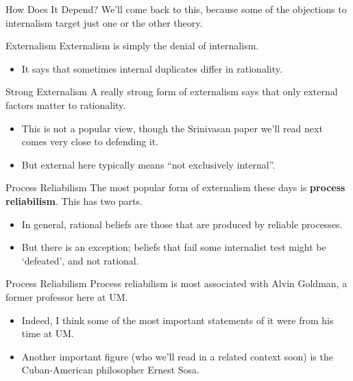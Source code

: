 \documentclass[
  17pt,
  letterpaper,
  ignorenonframetext,
  aspectratio=169,
  handout]{beamer}
\providecommand{\tightlist}{%
  \setlength{\itemsep}{0pt}\setlength{\parskip}{0pt}}\usepackage{longtable,booktabs,array}
\begin{document}
\begin{frame}{How Does It Depend?}
\protect\hypertarget{how-does-it-depend-1}{}
We'll come back to this, because some of the objections to internalism
target just one or the other theory.
\end{frame}

\begin{frame}{Externalism}
\protect\hypertarget{externalism}{}
Externalism is simply the denial of internalism.

\begin{itemize}[<+->]
\tightlist
\item
  It says that sometimes internal duplicates differ in rationality.
\end{itemize}
\end{frame}

\begin{frame}{Strong Externalism}
\protect\hypertarget{strong-externalism}{}
A really strong form of externalism says that only external factors
matter to rationality.

\begin{itemize}[<+->]
\tightlist
\item
  This is not a popular view, though the Srinivasan paper we'll read
  next comes very close to defending it.
\item
  But external here typically means ``not exclusively internal''.
\end{itemize}
\end{frame}

\begin{frame}{Process Reliabilism}
\protect\hypertarget{process-reliabilism}{}
The most popular form of externalism these days is \textbf{process
reliabilism}. This has two parts.

\begin{itemize}[<+->]
\tightlist
\item
  In general, rational beliefs are those that are produced by reliable
  processes.
\item
  But there is an exception; beliefs that fail some internalist test
  might be `defeated', and not rational.
\end{itemize}
\end{frame}

\begin{frame}{Process Reliabilism}
\protect\hypertarget{process-reliabilism-1}{}
Process reliabilism is most associated with Alvin Goldman, a former
professor here at UM.

\begin{itemize}[<+->]
\tightlist
\item
  Indeed, I think some of the most important statements of it were from
  his time at UM.
\item
  Another important figure (who we'll read in a related context soon) is
  the Cuban-American philosopher Ernest Sosa.
\end{itemize}
\end{frame}
\end{document}
